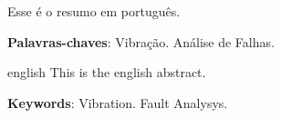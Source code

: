 \setlength{\absparsep}{18pt} %
\begin{resumo}
	Esse é o resumo em português.
	\lipsum[7]
	\vspace{\onelineskip}
	
	\noindent 
	\textbf{Palavras-chaves}: Vibração. Análise de Falhas.
\end{resumo}

\begin{resumo}[Abstract]
 \begin{otherlanguage*}{english}
   This is the english abstract.
   \lipsum[7]
   \vspace{\onelineskip}
 
   \noindent 
   \textbf{Keywords}: Vibration. Fault Analysys.
 \end{otherlanguage*}
\end{resumo}
